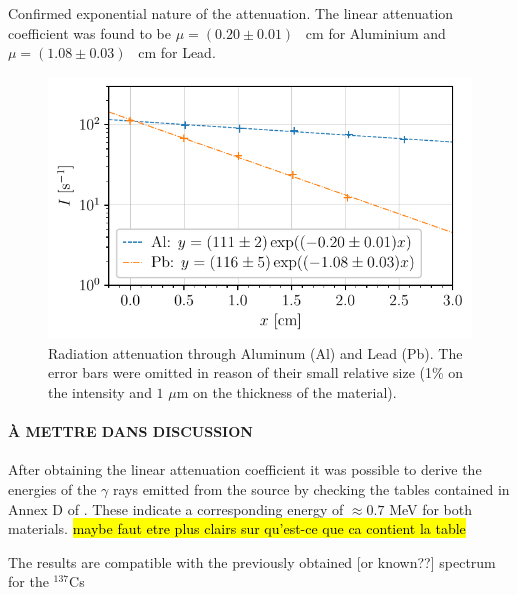 Confirmed exponential nature of the attenuation.
The linear attenuation coefficient was found to be $\mu = (0.20 \pm 0.01)$ \unit{\per\cm} for Aluminium
and $\mu = (1.08 \pm 0.03)$ \unit{\per\cm} for Lead.
\begin{figure}[htbp]
    \centering
    \includegraphics[scale=1]{figures/attenuation_coefficient.pdf}
    \caption{Radiation attenuation through Aluminum (Al) and Lead (Pb). 
             The error bars were omitted in reason of their small relative size 
             (1\% on the intensity and $1$ $\mu$m on the thickness of the material).}
    \label{fig:attenuation_coefficient}
\end{figure}

\paragraph{À METTRE DANS DISCUSSION}
After obtaining the linear attenuation coefficient it was possible to derive the energies of the $\gamma$ rays emitted from the source by checking the tables contained in Annex D of \cite{notice_generale}.
These indicate a corresponding energy of $\approx 0.7$ MeV for both materials.
\hl{maybe faut etre plus clairs sur qu'est-ce que ca contient la table}

The results are compatible with the previously obtained [or known??] spectrum for the $^{137}$Cs

